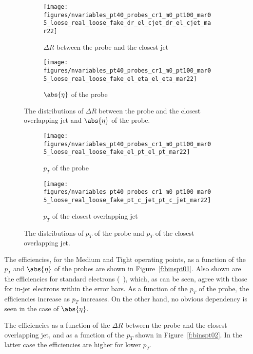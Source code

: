 \begin{figure}[H]
	\begin{subfigure}{0.5\textwidth}
		\texttt{[image: figures/nvariables\_pt40\_probes\_cr1\_m0\_pt100\_mar05\_loose\_real\_loose\_fake\_dr\_el\_cjet\_dr\_el\_cjet\_mar22]}
		\label{bfptprobe}
		\caption{$\Delta R $ between the probe and the closest jet}
	\end{subfigure}
	\begin{subfigure}{0.5\textwidth}
		\texttt{[image: figures/nvariables\_pt40\_probes\_cr1\_m0\_pt100\_mar05\_loose\_real\_loose\_fake\_el\_eta\_el\_eta\_mar22]}
		\caption{$\abs{\eta}$ of the probe}
	\end{subfigure}

	\centering

	\caption{The distributions of $\Delta R $ between the probe and the closest
		overlapping jet and $\abs{\eta}$ of the probe.}

	\label{f:bins01}
\end{figure}

\begin{figure}
	\begin{subfigure}{0.5\textwidth}
		\texttt{[image: figures/nvariables\_pt40\_probes\_cr1\_m0\_pt100\_mar05\_loose\_real\_loose\_fake\_el\_pt\_el\_pt\_mar22]}
		\caption{$p_T$ of the probe}
	\end{subfigure}
	\begin{subfigure}{0.5\textwidth}
		\texttt{[image: figures/nvariables\_pt40\_probes\_cr1\_m0\_pt100\_mar05\_loose\_real\_loose\_fake\_pt\_c\_jet\_pt\_c\_jet\_mar22]}
		\caption{$p_T$ of the closest overlapping jet}
	\end{subfigure}

	\centering

	\caption{The distributions of $p_T$ of the probe and $p_T$ of the closest
		overlapping jet.}

	\label{f:bins02}
\end{figure}

The efficiencies, for the Medium and Tight operating points, as a function of
the $p_T$ and $\abs{\eta}$ of the probes are shown in Figure~\ref{f:binspt01}.
Also shown are the efficiencies for standard electrons
(~\cite{atlaselcid,eleffme}), which, as can be seen, agree with those for
in-jet electrons within the error bars. As a function of the $p_T$ of the
probe, the efficiencies increase as $p_T$ increases. On the other hand, no
obvious dependency is seen in the case of $\abs{\eta}$.


The efficiencies as a function of the $\Delta R$ between the probe and the
closest overlapping jet, and as a function of the $p_T$ shown in
Figure~\ref{f:binspt02}. In the latter case the efficiencies are higher for
lower $p_T$.


